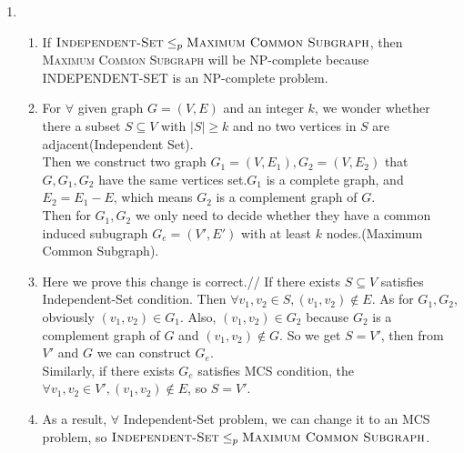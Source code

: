 \documentclass[12pt,a4paper]{article}
\makeatletter
\newtheorem*{solution}{Solution}
\theoremstyle{definition}
\renewenvironment{solution}[1][Solution] {\par\pushQED{\qed}\normalfont\topsep6\p@\@plus6\p@\relax\trivlist\item[\hskip\labelsep\bfseries#1\@addpunct{.}]\ignorespaces}{\popQED\endtrivlist\@endpefalse} \makeatother
\makeatother
\begin{document}
\begin{enumerate}
	\begin{solution}
	\begin{enumerate}
	~\par
	    \item If  $\textsc{Independent-Set}\leq_p\textsc{Maximum Common Subgraph}$, then \textsc{Maximum Common Subgraph} will be NP-complete because \textsc{INDEPENDENT-SET} is an NP-complete problem.
	    \item For $\forall$ given graph $G=(V,E)$ and an integer $k$, we wonder whether there a subset $S\subseteq V$ with $|S|\ge k$ and no two vertices in $S$ are adjacent(Independent Set).\\
        Then we construct two graph $G_1=(V,E_1),G_2=(V,E_2)$ that $G,G_1,G_2$ have the same vertices set.$G_1$ is a complete graph, and $E_2=E_1-E$, which means $G_2$ is a complement graph of $G$.\\
        Then for $G_1,G_2$ we only need to decide whether they have a common induced subugraph $G_e=(V',E')$ with at least $k$ nodes.(Maximum Common Subgraph).
        \item Here we prove this change is correct.//
        If there exists $S\subseteq V$ satisfies Independent-Set condition. Then $\forall v_1,v_2\in S,(v_1,v_2)\notin E$. As for $G_1,G_2$, obviously $(v_1,v_2)\in G_1$. Also, $(v_1,v_2)\in G_2$ because  $G_2$ is a complement graph of $G$ and $(v_1,v_2)\notin G$. So we get $S=V'$, then from $V'$ and $G$ we can construct $G_e$.\\
        Similarly, if there exists $G_e$ satisfies MCS condition, the $\forall v_1,v_2\in V',(v_1,v_2)\notin E$, so $S=V'$.
        \item As a result, $\forall$ Independent-Set problem, we can change it to an MCS problem, so $\textsc{Independent-Set}\leq_p\textsc{Maximum Common Subgraph}$.
	\end{enumerate}
    

\end{solution}
\end{enumerate}
\end{document}

